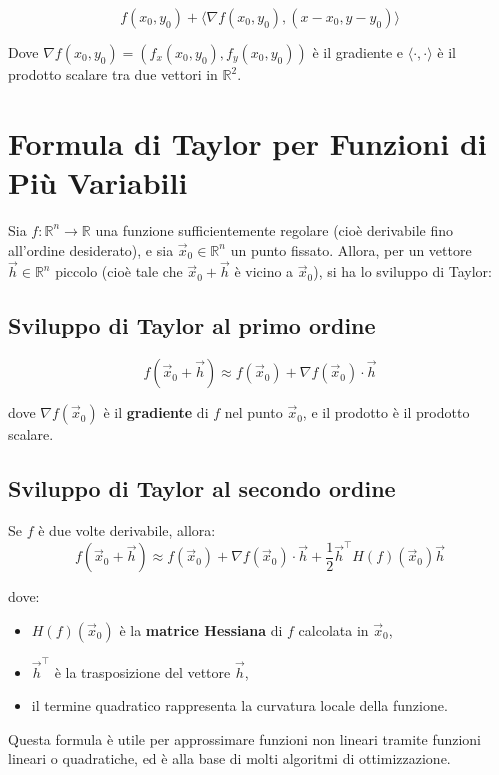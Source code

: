 \documentclass{article}
\begin{document}
\[
f(x_0, y_0) + \langle \nabla f(x_0, y_0), (x - x_0, y - y_0) \rangle
\]

Dove \( \nabla f(x_0, y_0) = (f_x(x_0, y_0), f_y(x_0, y_0)) \) è il gradiente e \( \langle \cdot, \cdot \rangle \) è il prodotto scalare tra due vettori in \( \mathbb{R}^2 \).

\section{Formula di Taylor per Funzioni di Più Variabili}

Sia \( f: \mathbb{R}^n \to \mathbb{R} \) una funzione sufficientemente regolare (cioè derivabile fino all'ordine desiderato), e sia \( \vec{x}_0 \in \mathbb{R}^n \) un punto fissato. Allora, per un vettore \( \vec{h} \in \mathbb{R}^n \) piccolo (cioè tale che \( \vec{x}_0 + \vec{h} \) è vicino a \( \vec{x}_0 \)), si ha lo sviluppo di Taylor:

\subsection*{Sviluppo di Taylor al primo ordine}
\[
f(\vec{x}_0 + \vec{h}) \approx f(\vec{x}_0) + \nabla f(\vec{x}_0) \cdot \vec{h}
\]

dove \( \nabla f(\vec{x}_0) \) è il \textbf{gradiente} di \( f \) nel punto \( \vec{x}_0 \), e il prodotto è il prodotto scalare.

\subsection*{Sviluppo di Taylor al secondo ordine}
Se \( f \) è due volte derivabile, allora:
\[
f(\vec{x}_0 + \vec{h}) \approx f(\vec{x}_0) + \nabla f(\vec{x}_0) \cdot \vec{h} + \frac{1}{2} \vec{h}^\top H(f)(\vec{x}_0) \vec{h}
\]

dove:
\begin{itemize}
    \item \( H(f)(\vec{x}_0) \) è la \textbf{matrice Hessiana} di \( f \) calcolata in \( \vec{x}_0 \),
    \item \( \vec{h}^\top \) è la trasposizione del vettore \( \vec{h} \),
    \item il termine quadratico rappresenta la curvatura locale della funzione.
\end{itemize}

Questa formula è utile per approssimare funzioni non lineari tramite funzioni lineari o quadratiche, ed è alla base di molti algoritmi di ottimizzazione.
\end{document}
